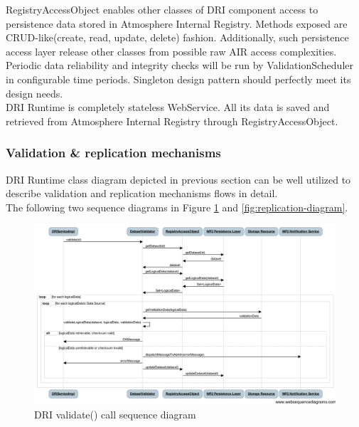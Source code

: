 \documentclass[a4paper,12pt,titlepage]{article}
\begin{document}
\noindent
RegistryAccessObject enables other classes of DRI component access to persistence data stored in Atmosphere Internal Registry. Methods exposed are CRUD-like(create, read, update, delete) fashion. Additionally, such persistence access layer release other classes from possible raw AIR access complexities.\\

\noindent
Periodic data reliability and integrity checks will be run by ValidationScheduler in configurable time periods. Singleton design pattern should perfectly meet its design needs.\\

\noindent
DRI Runtime is completely stateless WebService. All its data is saved and retrieved from Atmosphere Internal Registry through RegistryAccessObject.

\subsubsection{Validation \& replication mechanisms}
DRI Runtime class diagram depicted in previous section can be well utilized to describe validation and replication mechanisms flows in detail.\\

\noindent
The following two sequence diagrams in Figure \ref{fig:validation-diagram} and \ref{fig:replication-diagram}.\\

\begin{figure}[h!]
	\centering
	\includegraphics[width=1.0\textwidth]{img/validation-diagram.png}
	\caption{DRI validate() call sequence diagram}
	\label{fig:validation-diagram}
\end{figure}
\end{document}
